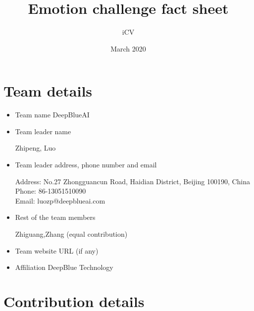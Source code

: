 \documentclass{article}
\title{Emotion challenge fact sheet}
\author{iCV}
\date{March 2020}
\begin{document}
\maketitle

\section{Team details}

\begin{itemize}
\item Team name
DeepBlueAI

\item Team leader name

Zhipeng, Luo
\item Team leader address, phone number and email

Address: No.27 Zhongguancun Road, Haidian District, Beijing 100190, China \\
Phone: 86-13051510090 \\
Email: luozp@deepblueai.com

\item Rest of the team members

Zhiguang,Zhang (equal contribution)

\item Team website URL (if any)

\item Affiliation
DeepBlue Technology

\end{itemize}

\section{Contribution details}
\end{document}
